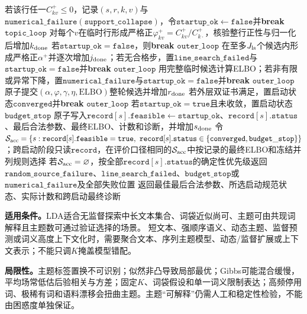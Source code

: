 \begin{AlgorithmContract}
\begin{algorithm}[tbp]
{{{{        若该行任一$C_{kv}^+\le0$，记录$(s,r,k,v)$与$\mathtt{numerical\_failure}(\mathtt{support\_collapse})$，令$\mathtt{startup\_ok}\leftarrow\mathtt{false}$并\textbf{break }$\mathtt{topic\_loop}$\;
        对每个$v$在临时行形成严格正$\varphi_{kv}^+=C_{kv}^+/C_{k\cdot}^+$，核验整行正性与归一化后增加$k_{\rm done}$\;
      }
      若$\mathtt{startup\_ok}=\mathtt{false}$，则\textbf{break }$\mathtt{outer\_loop}$\;
      在至多$J_{\rm ls}$个候选内形成严格正$\alpha^+$并逐次增加$j_{\rm done}$；若无合格步，置$\mathtt{line\_search\_failed}$与$\mathtt{startup\_ok}=\mathtt{false}$并\textbf{break }$\mathtt{outer\_loop}$\;
      用完整临时候选计算ELBO；若非有限或异常下降，置$\mathtt{numerical\_failure}$与$\mathtt{startup\_ok}=\mathtt{false}$并\textbf{break }$\mathtt{outer\_loop}$\;
      原子提交$(\alpha,\varphi,\gamma,\eta,\mathrm{ELBO})$整轮候选并增加$r_{\rm done}$\;
      若外层双证书满足，置启动状态$\mathtt{converged}$并\textbf{break }$\mathtt{outer\_loop}$\;
    }
    若$\mathtt{startup\_ok}=\mathtt{true}$且未收敛，置启动状态$\mathtt{budget\_stop}$\;
  }
  原子写入$\mathtt{record}[s].\mathtt{feasible}\leftarrow\mathtt{startup\_ok}$、$\mathtt{record}[s].\mathtt{status}$、最后合法参数、最终ELBO、计数和诊断，并增加$s_{\rm done}$\;
}
令$\mathcal S_{\rm acc}=\{s:\mathtt{record}[s].\mathtt{feasible}=\mathtt{true},\ \mathtt{record}[s].\mathtt{status}\in\{\mathtt{converged},\mathtt{budget\_stop}\}\}$；跨启动阶段只读$\mathtt{record}$，在评价口径相同的$\mathcal S_{\rm acc}$中按记录的最终ELBO和冻结并列规则选择\;
若$\mathcal S_{\rm acc}=\varnothing$，按全部$\mathtt{record}[s].\mathtt{status}$的确定性优先级返回$\mathtt{random\_source\_failure}$、$\mathtt{line\_search\_failed}$、$\mathtt{budget\_stop}$或$\mathtt{numerical\_failure}$及全部失败位置\;
返回最佳最后合法参数、所选启动规范状态、实际计数和跨启动最终诊断\;
\end{algorithm}
\end{AlgorithmContract}
\FloatBarrier
{}
\endgroup

\label{struct:V5-C06-CH28}
\textbf{适用条件。}LDA适合无监督探索中长文本集合、词袋近似尚可、主题可由共现词解释且主题数可通过验证选择的场景。
短文本、强顺序语义、动态主题、监督预测或词义高度上下文化时，需要聚合文本、序列主题模型、动态/监督扩展或上下文表示；不能只调$K$掩盖模型错配。

\label{struct:V5-C06-CH29}
\textbf{局限性。}主题标签置换不可识别；似然非凸导致局部最优；Gibbs可能混合缓慢，平均场常低估后验相关与方差；固定$K$、词袋假设和单一词义限制表达；高频停用词、极稀有词和语料漂移会扭曲主题。主题“可解释”仍需人工和稳定性检验，不能由困惑度单独保证。

